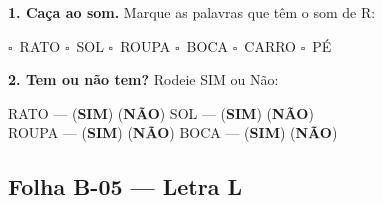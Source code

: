 \begin{somletra}[title={\faMusic~Atividade de Som da Letra --- B\^onus (n\~ao vale nota)}]
\textbf{1. Ca\c{c}a ao som.} Marque as palavras que t\^e{}m o som de R:
\begin{center}
$\square$~RATO \quad $\square$~SOL \quad $\square$~ROUPA \quad $\square$~BOCA \quad $\square$~CARRO \quad $\square$~P\'E
\end{center}

\textbf{2. Tem ou n\~ao{} tem?} Rodeie SIM ou N\~ao:
\begin{center}
RATO --- (\textbf{SIM}) (\textbf{N\~AO}) \quad SOL --- (\textbf{SIM}) (\textbf{N\~AO}) \\ ROUPA --- (\textbf{SIM}) (\textbf{N\~AO}) \quad BOCA --- (\textbf{SIM}) (\textbf{N\~AO})
\end{center}
\end{somletra}



\subsection{Folha B-05 --- Letra L}

